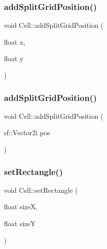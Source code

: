 \subsubsection{\texorpdfstring{addSplitGridPosition()}{addSplitGridPosition()}\hspace{0.1cm}{\footnotesize\ttfamily [1/2]}}
{\footnotesize\ttfamily void Cell\+::add\+Split\+Grid\+Position (\begin{DoxyParamCaption}\item[{float}]{x,  }\item[{float}]{y }\end{DoxyParamCaption})\hspace{0.3cm}{\ttfamily [inline]}}

\mbox{\label{class_cell_aa60de37dfe4cadffa660e8239e68546d}} 
\subsubsection{\texorpdfstring{addSplitGridPosition()}{addSplitGridPosition()}\hspace{0.1cm}{\footnotesize\ttfamily [2/2]}}
{\footnotesize\ttfamily void Cell\+::add\+Split\+Grid\+Position (\begin{DoxyParamCaption}\item[{sf\+::\+Vector2i}]{pos }\end{DoxyParamCaption})\hspace{0.3cm}{\ttfamily [inline]}}

\mbox{\label{class_cell_a22a3a73581af175918b3601ee1bf40f2}} 
\subsubsection{\texorpdfstring{setRectangle()}{setRectangle()}}
{\footnotesize\ttfamily void Cell\+::set\+Rectangle (\begin{DoxyParamCaption}\item[{float}]{sizeX,  }\item[{float}]{sizeY }\end{DoxyParamCaption})\hspace{0.3cm}{\ttfamily [inline]}}



